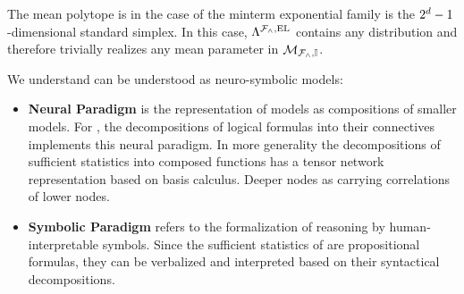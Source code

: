 \begin{example}
    The mean polytope is in the case of the minterm exponential family is the $2^d-1$-dimensional standard simplex.
    In this case, $\Lambda^{\mathcal{F}_{\land},\mathrm{EL}}$ contains any distribution and therefore trivially realizes any mean parameter in $\mathcal{M}_{\mathcal{F}_{\land},\mathbb{I}}$.
\end{example}



We understand \HybridLogicNetworks{} can be understood as neuro-symbolic models:
\begin{itemize}
    \item \textbf{Neural Paradigm} is the representation of models as compositions of smaller models.
    For \HybridLogicNetworks{}, the decompositions of logical formulas into their connectives implements this neural paradigm.
    In more generality the decompositions of sufficient statistics into composed functions has a tensor network representation based on basis calculus.
    Deeper nodes as carrying correlations of lower nodes.
    \item \textbf{Symbolic Paradigm} refers to the formalization of reasoning by human-interpretable symbols.
    Since the sufficient statistics of \HybridLogicNetworks{} are propositional formulas, they can be verbalized and interpreted based on their syntactical decompositions.
\end{itemize}

